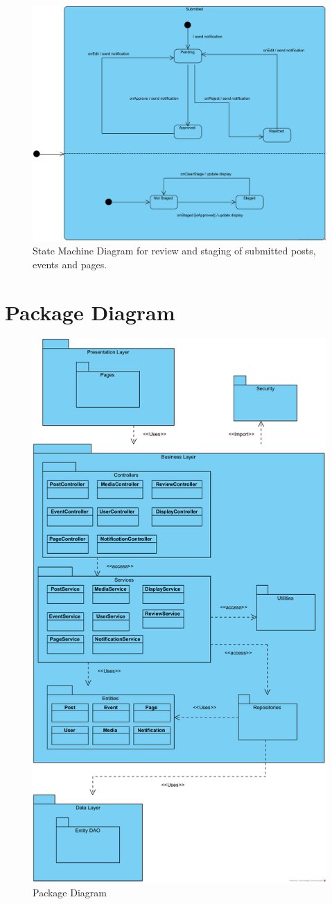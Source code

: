 \documentclass{article}
\begin{document}
\begin{figure}[H]
    \centering
    \includegraphics[width=.98\textwidth]{images/State_Machine_Diagram.png}
    \centering
    \caption{State Machine Diagram for review and staging of submitted posts, events and pages.}
\end{figure}
\section{Package Diagram}

\begin{figure}[H]
    \centering
    \includegraphics[width=.64\textwidth]{images/Package_Diagram.png}
    \centering
    \caption{Package Diagram}
\end{figure}
\end{document}
